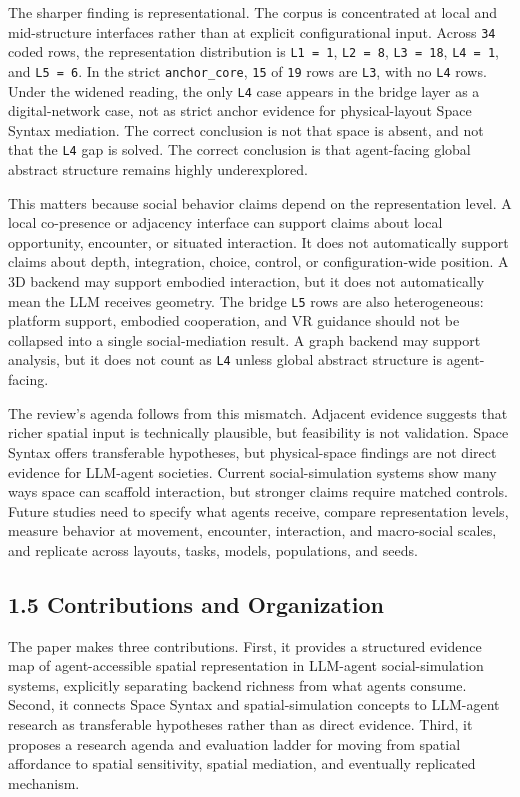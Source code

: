 \documentclass[
  twocolumn]{article}
\begin{document}
The sharper finding is representational. The corpus is concentrated at
local and mid-structure interfaces rather than at explicit
configurational input. Across \texttt{34} coded rows, the representation
distribution is \texttt{L1\ =\ 1}, \texttt{L2\ =\ 8},
\texttt{L3\ =\ 18}, \texttt{L4\ =\ 1}, and \texttt{L5\ =\ 6}. In the
strict \texttt{anchor\_core}, \texttt{15} of \texttt{19} rows are
\texttt{L3}, with no \texttt{L4} rows. Under the widened reading, the
only \texttt{L4} case appears in the bridge layer as a digital-network
case, not as strict anchor evidence for physical-layout Space Syntax
mediation. The correct conclusion is not that space is absent, and not
that the \texttt{L4} gap is solved. The correct conclusion is that
agent-facing global abstract structure remains highly underexplored.

This matters because social behavior claims depend on the representation
level. A local co-presence or adjacency interface can support claims
about local opportunity, encounter, or situated interaction. It does not
automatically support claims about depth, integration, choice, control,
or configuration-wide position. A 3D backend may support embodied
interaction, but it does not automatically mean the LLM receives
geometry. The bridge \texttt{L5} rows are also heterogeneous: platform
support, embodied cooperation, and VR guidance should not be collapsed
into a single social-mediation result. A graph backend may support
analysis, but it does not count as \texttt{L4} unless global abstract
structure is agent-facing.

The review's agenda follows from this mismatch. Adjacent evidence
suggests that richer spatial input is technically plausible, but
feasibility is not validation. Space Syntax offers transferable
hypotheses, but physical-space findings are not direct evidence for
LLM-agent societies. Current social-simulation systems show many ways
space can scaffold interaction, but stronger claims require matched
controls. Future studies need to specify what agents receive, compare
representation levels, measure behavior at movement, encounter,
interaction, and macro-social scales, and replicate across layouts,
tasks, models, populations, and seeds.

\subsection{1.5 Contributions and
Organization}\label{contributions-and-organization}

The paper makes three contributions. First, it provides a structured
evidence map of agent-accessible spatial representation in LLM-agent
social-simulation systems, explicitly separating backend richness from
what agents consume. Second, it connects Space Syntax and
spatial-simulation concepts to LLM-agent research as transferable
hypotheses rather than as direct evidence. Third, it proposes a research
agenda and evaluation ladder for moving from spatial affordance to
spatial sensitivity, spatial mediation, and eventually replicated
mechanism.
\end{document}

